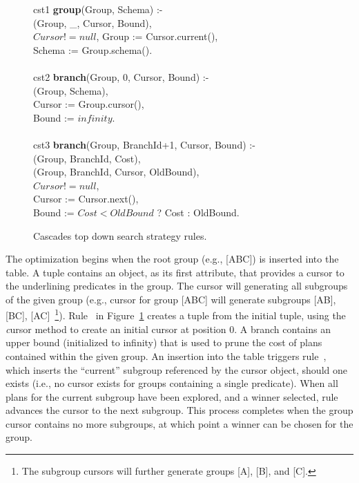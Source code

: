 \begin{figure}
\ssp
\centering
\begin{boxedminipage}{\linewidth}
cst1 {\bf group}(Group, Schema) :- \\
(Group, \_, Cursor, Bound), \\
\datalogspace $Cursor != null$,
\datalogspace Group := Cursor.current(), \\
\datalogspace Schema := Group.schema(). \\
\\
cst2 {\bf branch}(Group, 0, Cursor, Bound) :- \\
(Group, Schema), \\
\datalogspace Cursor := Group.cursor(), \\
\datalogspace Bound  := $infinity$. \\
\\
cst3 {\bf branch}(Group, BranchId+1, Cursor, Bound) :- \\
(Group, BranchId, Cost), \\
(Group, BranchId, Cursor, OldBound), \\
\datalogspace $Cursor != null$, \\
\datalogspace Cursor := Cursor.next(), \\
\datalogspace Bound := $Cost < OldBound$ ? Cost : OldBound. \\
  
\end{boxedminipage}
\caption{\label{ch:evita:fig:cascades_top_down} Cascades top down search strategy rules.}
\end{figure}

The optimization begins when the root group (e.g., [ABC]) is inserted into the
 table.  A  tuple contains an object, as its first
attribute, that provides a cursor to the underlining predicates in the group.
The cursor will generating all subgroups of the given group (e.g., cursor for
group [ABC] will generate subgroups [AB], [BC], [AC]~\footnote{The subgroup
cursors will further generate groups [A], [B], and [C].}).  Rule~ in
Figure~\ref{ch:evita:fig:cascades_top_down} creates a  tuple from
the initial  tuple, using the {\emph cursor} method to create an
initial cursor at position $0$.  A branch contains an upper bound (initialized
to infinity) that is used to prune the cost of plans contained within the given
group.  An insertion into the  table triggers rule~, which
inserts the ``current'' subgroup referenced by the cursor object, should one
exists (i.e., no cursor exists for groups containing a single predicate).  When
all plans for the current subgroup have been explored, and a winner selected,
rule~ advances the cursor to the next subgroup.  This process
completes when the group cursor contains no more subgroups, at which point a
winner can be chosen for the group.


